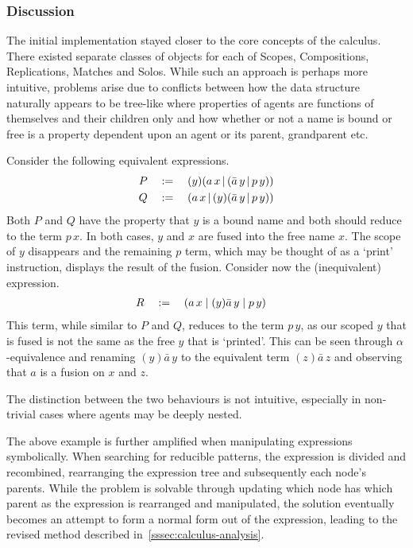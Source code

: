     \subsubsection{Discussion}
        The initial implementation stayed closer to the core concepts of the calculus.
        There existed separate classes of objects for each of Scopes, Compositions, Replications, Matches and Solos.
        While such an approach is perhaps more intuitive, problems arise due to conflicts between how the data structure naturally appears to be tree-like where properties of agents are functions of themselves and their children only and how whether or not a name is bound or free is a property dependent upon an agent or its parent, grandparent etc.

        \begin{example*}
            Consider the following equivalent expressions.
            \begin{align*}
                P \quad & := \quad (y)(a \, x \,|\, (\bar{a} \, y \,|\, p \, y)) \\
                Q \quad & := \quad (a \, x \,|\, (y)(\bar{a} \, y \,|\, p \, y))
            \end{align*}
            Both $P$ and $Q$ have the property that $y$ is a bound name and both should reduce to the term $p \, x$.
            In both cases, $y$ and $x$ are fused into the free name $x$. The scope of $y$ disappears and the remaining $p$ term, which may be thought of as a `print' instruction, displays the result of the fusion.
            Consider now the (inequivalent) expression.
            \begin{align*}
                R \quad & := \quad (a \, x \; | \; (y)\bar{a} \, y \; | \; p \, y)
            \end{align*}
            This term, while similar to $P$ and $Q$, reduces to the term $p \, y$, as our scoped $y$ that is fused is not the same as the free $y$ that is `printed'.
            This can be seen through $\alpha$-equivalence and renaming $(y)\bar{a} \, y$ to the equivalent term $(z)\bar{a} \, z$ and observing that $a$ is a fusion on $x$ and $z$.

            The distinction between the two behaviours is not intuitive, especially in non-trivial cases where agents may be deeply nested.
        \end{example*}

        The above example is further amplified when manipulating expressions symbolically.
        When searching for reducible patterns, the expression is divided and recombined, rearranging the expression tree and subsequently each node's parents.
        While the problem is solvable through updating which node has which parent as the expression is rearranged and manipulated, the solution eventually becomes an attempt to form a normal form out of the expression, leading to the revised method described in~\ref{sssec:calculus-analysis}.\\

